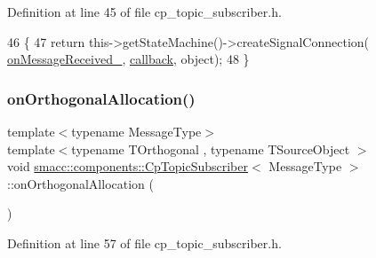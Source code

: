 Definition at line 45 of file cp\+\_\+topic\+\_\+subscriber.\+h.


\begin{DoxyCode}
46     \{
47         \textcolor{keywordflow}{return} this->getStateMachine()->createSignalConnection(
      \hyperlink{classsmacc_1_1components_1_1CpTopicSubscriber_aeec04e64cad880bd49d401c2a474c6e9}{onMessageReceived\_}, \hyperlink{sm__ridgeback__barrel__search__1_2servers_2opencv__perception__node_2opencv__perception__node_8cpp_a050e697bd654facce10ea3f6549669b3}{callback}, \textcolor{keywordtype}{object});
48     \}
\end{DoxyCode}
\mbox{\label{classsmacc_1_1components_1_1CpTopicSubscriber_a7ed50caff06e266a4df299a58fdf5ba0}} 
\subsubsection{\texorpdfstring{on\+Orthogonal\+Allocation()}{onOrthogonalAllocation()}}
{\footnotesize\ttfamily template$<$typename Message\+Type$>$ \\
template$<$typename T\+Orthogonal , typename T\+Source\+Object $>$ \\
void \hyperlink{classsmacc_1_1components_1_1CpTopicSubscriber}{smacc\+::components\+::\+Cp\+Topic\+Subscriber}$<$ Message\+Type $>$\+::on\+Orthogonal\+Allocation (\begin{DoxyParamCaption}{ }\end{DoxyParamCaption})\hspace{0.3cm}{\ttfamily [inline]}}



Definition at line 57 of file cp\+\_\+topic\+\_\+subscriber.\+h.


